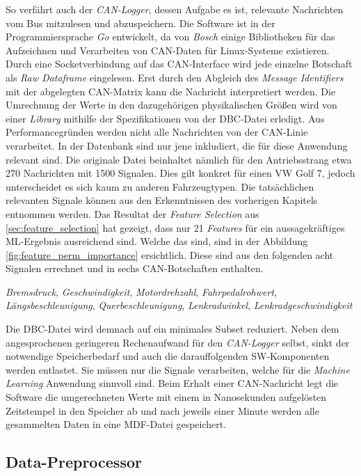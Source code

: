 So verfährt auch der \textit{CAN-Logger}, dessen Aufgabe es ist, relevante Nachrichten vom Bus mitzulesen und abzuspeichern. Die Software ist in der Programmiersprache \textit{Go} entwickelt, da von \textit{Bosch} einige Bibliotheken für das Aufzeichnen und Verarbeiten von CAN-Daten für Linux-Systeme existieren. Durch eine Socketverbindung auf das CAN-Interface wird jede einzelne Botschaft als \textit{Raw Dataframe} eingelesen. Erst durch den Abgleich des \textit{Message Identifiers} mit der abgelegten CAN-Matrix kann die Nachricht interpretiert werden. Die Umrechnung der Werte in den dazugehörigen physikalischen Größen wird von einer \textit{Library} mithilfe der Spezifikationen von der DBC-Datei erledigt. Aus Performancegründen werden nicht alle Nachrichten von der CAN-Linie verarbeitet. In der Datenbank sind nur jene inkludiert, die für diese Anwendung relevant sind. Die originale Datei beinhaltet nämlich für den Antriebsstrang etwa 270 Nachrichten mit 1500 Signalen. Dies gilt konkret für einen VW Golf 7, jedoch unterscheidet es sich kaum zu anderen Fahrzeugtypen. Die tatsächlichen relevanten Signale können aus den Erkenntnissen des vorherigen Kapitels entnommen werden. Das Resultat der \textit{Feature Selection} aus \ref{sec:feature_selection} hat gezeigt, dass nur 21 \textit{Features} für ein aussagekräftiges ML-Ergebnis ausreichend sind. Welche das sind, sind in der Abbildung \ref{fig:feature_perm_importance} ersichtlich. Diese sind aus den folgenden acht Signalen errechnet und in sechs CAN-Botschaften enthalten.

\textit{Bremsdruck}, \textit{Geschwindigkeit}, \textit{Motordrehzahl}, \textit{Fahrpedalrohwert}, \textit{Längsbeschleunigung}, \textit{Querbeschleunigung}, \textit{Lenkradwinkel}, \textit{Lenkradgeschwindigkeit}

Die DBC-Datei wird demnach auf ein minimales Subset reduziert. Neben dem angesprochenen geringeren Rechenaufwand für den \textit{CAN-Logger} selbst, sinkt der notwendige Speicherbedarf und auch die darauffolgenden SW-Komponenten werden entlastet. Sie müssen nur die Signale verarbeiten, welche für die \textit{Machine Learning} Anwendung sinnvoll sind. Beim Erhalt einer CAN-Nachricht legt die Software die umgerechneten Werte mit einem in Nanosekunden aufgelösten Zeitstempel in den Speicher ab und nach jeweils einer Minute werden alle gesammelten Daten in eine MDF-Datei gespeichert.

\subsection{Data-Preprocessor}
\label{sec:data_preprocessor}

